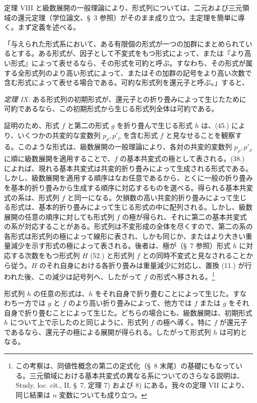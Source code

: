 \documentclass[11pt]{jlreq}
\begin{document}
定理 VIII と級数展開の一般理論により、形式列については、二元および三元領域の還元定理（学位論文、\S\ 3 参照）がそのまま成り立つ。主定理を簡単に導く。まず定義を述べる。

「与えられた形式系において、ある有限個の形式が一つの加群にまとめられているとする。ある形式が、因子として不変式をもつ形式によって、または『より高い形式』によって表せるなら、その形式を可約と呼ぶ。すなわち、その形式が属する全形式列のより高い形式によって、またはその加群の記号をより高い次数で含む形式によって表せる場合である。可約な形式列を還元子と呼ぶ。」すると、

\emph{定理 IX:} ある形式列の初期形式が、還元子との折り畳みによって生じたために可約であるなら、この初期形式から生じる形式列全体は可約である。

証明のため、形式 $f$ と第二の形式 $g$ を折り畳んで生じる形式 $h$ は、(45.) により、いくつかの共変的な変数列 $p_\rho,p'_\rho$ を含む形式 $f$ と見なせることを観察する。このような形式は、級数展開の一般理論により、各対の共変的変数列 $p_\rho,p'_\rho$ に順に級数展開を適用することで、$f$ の基本共変式の極として表される。(38.) によれば、現れる基本共変式は共変的折り畳みによって生成される形式である。しかし、級数展開を適用する順序はなお任意であるから、とくに一般の折り畳みを基本的折り畳みから生成する順序に対応するものを選べる。得られる基本共変式の系は、形式列 $f$ と同一になる。欠損数の高い共変的折り畳みによって生じる形式は、基本的折り畳みによって生じる形式の中に配列される。しかし、級数展開の任意の順序に対しても形式列 $f$ の極が得られ、それに第二の基本共変式の系が対応することがある。形式列は不変形成の全体を尽くすので、第二の系の各形式は形式列の極によって線形に表され、しかも同じか、またはより大きい重量減少を示す形式の極によって表される。後者は、極が（\S\ 7 参照）形式 $h$ に対応する次数をもつ形式列 $H$ (52.) と形式列 $f$ との同時不変式と見なされることから従う。$H$ のそれ自身における各折り畳みは重量減少に対応し、置換 (11.) が行われた後、この減少は記号列へ、したがって $f$ の形式へ移される。\footnote{この考察は、同値性概念の第二の定式化（\S\ 8 末尾）の基礎にもなっている。三元領域における基本共変式の異なる系についてのさらなる説明は、Study, loc. cit., II, \S\ 7, 定理 7) および 8) にある。我々の定理 VII により、同じ結果は $n$ 変数についても成り立つ。}

形式列 $h$ の任意の形式は、$h$ をそれ自身で折り畳むことによって生じた。すなわち一方では $g$ と $f$ のより高い折り畳みによって、他方では $f$ または $g$ をそれ自身で折り畳むことによって生じた。どちらの場合にも、級数展開は、初期形式 $h$ について上で示したのと同じように、形式列 $f$ の極へ導く。特に $f$ が還元子であるなら、還元子の極による展開が得られる。したがって形式列 $h$ は可約となる。
\end{document}
